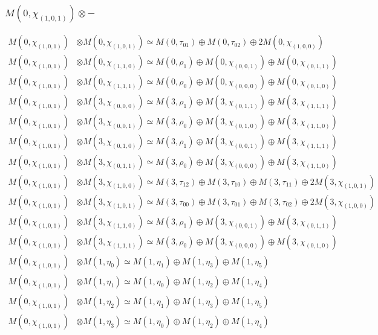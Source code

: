 \subsubsection{$ M(0,\chi_{(1,0,1)})\otimes -$}
\begin{align*}
M(0,\chi_{(1,0,1)}) &\otimes M(0,\chi_{(1,0,1)}) \simeq M(0,\tau_{01}) \oplus M(0,\tau_{02}) \oplus 2 M(0,\chi_{(1,0,0)}) \\
M(0,\chi_{(1,0,1)}) &\otimes M(0,\chi_{(1,1,0)}) \simeq M(0,\rho_{1}) \oplus M(0,\chi_{(0,0,1)}) \oplus M(0,\chi_{(0,1,1)}) \\
M(0,\chi_{(1,0,1)}) &\otimes M(0,\chi_{(1,1,1)}) \simeq M(0,\rho_{0}) \oplus M(0,\chi_{(0,0,0)}) \oplus M(0,\chi_{(0,1,0)}) \\
M(0,\chi_{(1,0,1)}) &\otimes M(3,\chi_{(0,0,0)}) \simeq M(3,\rho_{1}) \oplus M(3,\chi_{(0,1,1)}) \oplus M(3,\chi_{(1,1,1)}) \\
M(0,\chi_{(1,0,1)}) &\otimes M(3,\chi_{(0,0,1)}) \simeq M(3,\rho_{0}) \oplus M(3,\chi_{(0,1,0)}) \oplus M(3,\chi_{(1,1,0)}) \\
M(0,\chi_{(1,0,1)}) &\otimes M(3,\chi_{(0,1,0)}) \simeq M(3,\rho_{1}) \oplus M(3,\chi_{(0,0,1)}) \oplus M(3,\chi_{(1,1,1)}) \\
M(0,\chi_{(1,0,1)}) &\otimes M(3,\chi_{(0,1,1)}) \simeq M(3,\rho_{0}) \oplus M(3,\chi_{(0,0,0)}) \oplus M(3,\chi_{(1,1,0)}) \\
M(0,\chi_{(1,0,1)}) &\otimes M(3,\chi_{(1,0,0)}) \simeq M(3,\tau_{12}) \oplus M(3,\tau_{10}) \oplus M(3,\tau_{11}) \oplus 2 M(3,\chi_{(1,0,1)}) \\
M(0,\chi_{(1,0,1)}) &\otimes M(3,\chi_{(1,0,1)}) \simeq M(3,\tau_{00}) \oplus M(3,\tau_{01}) \oplus M(3,\tau_{02}) \oplus 2 M(3,\chi_{(1,0,0)}) \\
M(0,\chi_{(1,0,1)}) &\otimes M(3,\chi_{(1,1,0)}) \simeq M(3,\rho_{1}) \oplus M(3,\chi_{(0,0,1)}) \oplus M(3,\chi_{(0,1,1)}) \\
M(0,\chi_{(1,0,1)}) &\otimes M(3,\chi_{(1,1,1)}) \simeq M(3,\rho_{0}) \oplus M(3,\chi_{(0,0,0)}) \oplus M(3,\chi_{(0,1,0)}) \\
M(0,\chi_{(1,0,1)}) &\otimes M(1,\eta_{0}) \simeq M(1,\eta_{1}) \oplus M(1,\eta_{3}) \oplus M(1,\eta_{5}) \\
M(0,\chi_{(1,0,1)}) &\otimes M(1,\eta_{1}) \simeq M(1,\eta_{0}) \oplus M(1,\eta_{2}) \oplus M(1,\eta_{4}) \\
M(0,\chi_{(1,0,1)}) &\otimes M(1,\eta_{2}) \simeq M(1,\eta_{1}) \oplus M(1,\eta_{3}) \oplus M(1,\eta_{5}) \\
M(0,\chi_{(1,0,1)}) &\otimes M(1,\eta_{3}) \simeq M(1,\eta_{0}) \oplus M(1,\eta_{2}) \oplus M(1,\eta_{4}) \\

\end{align*}

